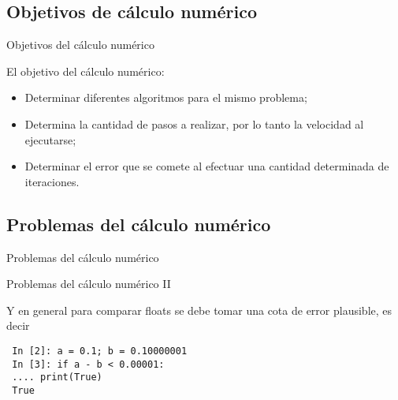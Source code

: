 \documentclass{beamer}
\begin{document}
\subsection{Objetivos de cálculo numérico}

\begin{frame}{Objetivos del cálculo numérico}

    El objetivo del cálculo numérico:
    \begin{itemize}
    \item Determinar diferentes algoritmos para el mismo problema;
    \item Determina la cantidad de pasos a realizar, por lo tanto la velocidad al ejecutarse;
    \item Determinar el error que se comete al efectuar una cantidad determinada de iteraciones.
    
    \end{itemize} 

\end{frame}

\subsection{Problemas del cálculo numérico}

\begin{frame}[fragile]{Problemas del cálculo numérico}





\end{frame}

\begin{frame}[fragile]{Problemas del cálculo numérico II}

Y en general para comparar floats se debe tomar una cota de error plausible, es decir
\begin{verbatim}
 In [2]: a = 0.1; b = 0.10000001
 In [3]: if a - b < 0.00001:
 .... print(True)
 True
\end{verbatim}

\end{frame}
\end{document}

